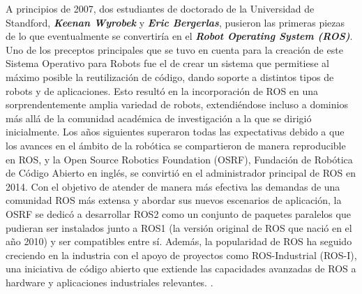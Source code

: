 \begin{itemize}
  A principios de 2007, dos estudiantes de doctorado de la Universidad de Standford, \textbf{\emph{Keenan Wyrobek}} y \textbf{\emph{Eric Bergerlas}}, pusieron las primeras piezas de lo que eventualmente se convertiría en el \textbf{\emph{Robot Operating System (ROS)}}. Uno de los preceptos principales que se tuvo en cuenta para la creación de este Sistema Operativo para Robots fue el de crear un sistema que permitiese al máximo posible la reutilización de código, dando soporte a distintos tipos de robots y de aplicaciones. Esto resultó en la incorporación de ROS en una sorprendentemente amplia variedad de robots, extendiéndose incluso a dominios más allá de la comunidad académica de investigación a la que se dirigió inicialmente. Los años siguientes superaron todas las expectativas debido a que los avances en el ámbito de la robótica se compartieron de manera reproducible en ROS, y la Open Source Robotics Foundation (OSRF), Fundación de Robótica de Código Abierto en inglés, se convirtió en el administrador principal de ROS en 2014. Con el objetivo de atender de manera más efectiva las demandas de una comunidad ROS más extensa y abordar sus nuevos escenarios de aplicación, la OSRF se dedicó a desarrollar ROS2 como un conjunto de paquetes paralelos que pudieran ser instalados junto a ROS1 (la versión original de ROS que nació en el año 2010) y ser compatibles entre sí. Además, la popularidad de ROS ha seguido creciendo en la industria con el apoyo de proyectos como ROS-Industrial (ROS-I), una iniciativa de código abierto que extiende las capacidades avanzadas de ROS a hardware y aplicaciones industriales relevantes. \cite{Suarez22}.
  

\end{itemize}
